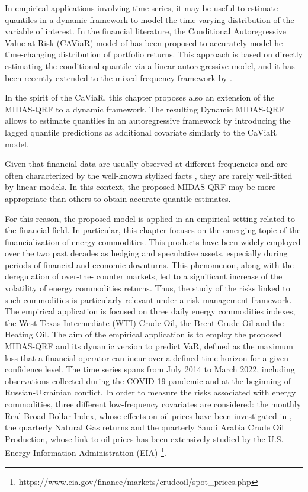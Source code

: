 \noindent In empirical applications involving time series, it may be useful to estimate quantiles in a dynamic framework to model the time-varying distribution of the variable of interest. In the financial literature, the Conditional Autoregressive Value-at-Risk (CAViaR) model of \cite{engle2004caviar} has been proposed to accurately model he time-changing distribution of portfolio returns. This approach is based on directly estimating the conditional quantile via a linear autoregressive model, and it has been recently extended to the mixed-frequency framework by \cite{xu2021quantile}.
\vspace{0.15in}

\noindent In the spirit of the CaViaR, this chapter proposes also an extension of the MIDAS-QRF to a dynamic framework. The resulting Dynamic MIDAS-QRF allows to estimate quantiles in an autoregressive framework by introducing the lagged quantile predictions as additional covariate similarly to the CaViaR model.

\vspace{0.15in}

\noindent Given that financial data are usually observed at different frequencies and are often characterized by the well-known stylized facts \citep{cont2001empirical}, they are rarely well-fitted by linear models. In this context, the proposed MIDAS-QRF may be more appropriate than others to obtain accurate quantile estimates. 
\vspace{0.15in}

\noindent For this reason, the proposed model is applied in an empirical setting related to the financial field. In particular, this chapter focuses on the emerging topic of the financialization of energy commodities. This products have been widely employed over the two past decades as  hedging and speculative assets, especially during
periods of financial and economic downturns. This phenomenon, along with the deregulation of over-the-
counter markets, led to a significant increase of the volatility of energy commodities returns.
Thus, the study of the risks linked to such commodities is particularly relevant under a risk management framework.
The empirical application is focused on three daily energy commodities indexes, the West Texas Intermediate (WTI) Crude Oil, the Brent Crude Oil and the Heating Oil. The aim of the empirical application is to employ the proposed MIDAS-QRF and its dynamic version to predict VaR, defined as the maximum loss that a financial operator can incur over a defined time horizon for a given confidence level. The time series spans from July 2014 to March 2022, including observations collected during the COVID-19 pandemic and at the beginning of Russian-Ukrainian conflict. In order to measure the risks associated with energy commodities, three different low-frequency covariates are considered: the monthly Real Broad Dollar Index, whose effects on oil prices have been investigated in \cite{LIN201659, AKRAM2009838}, the quarterly Natural Gas returns and the quarterly Saudi Arabia Crude Oil Production, whose link to oil prices has been extensively studied by the U.S. Energy Information Administration (EIA) \footnote{https://www.eia.gov/finance/markets/crudeoil/spot\_prices.php}.

